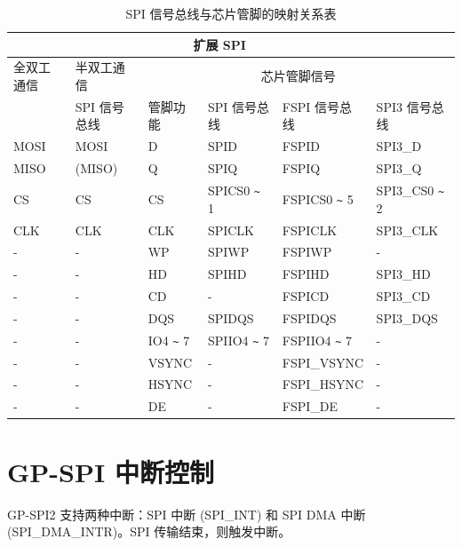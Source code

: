\documentclass[main\_\_CN.tex]{subfiles}
\begin{document}
\begin{longtable}[c]{|p{2.0cm}|p{2.0cm}|p{1.5cm}|p{2cm}|p{3.5cm}|p{2.5cm}|}    \caption{SPI 信号总线与芯片管脚的映射关系表}
\label{table:SPI_signals}\\
\hline
    \rowcolor{lightgray}
    \multicolumn{2}{c|}{标准 SPI} & \multicolumn{4}{c|}{扩展 SPI}\\
    \hline
    \rowcolor{lightgray}
    全双工通信 & 半双工通信 & \multicolumn{4}{c|}{芯片管脚信号}\\
    \hline
    \rowcolor{lightgray}
    \multirow{-1}{*}{SPI 信号总线} & \multirow{-1}{*}{SPI 信号总线} & \multirow{-1}{*}{管脚功能} & SPI 信号总线 & FSPI 信号总线 & SPI3 信号总线 \\
    \hline
    MOSI & MOSI   & D  & SPID             & FSPID  & SPI3\_D \\
    \hline
    MISO & (MISO) & Q  & SPIQ             & FSPIQ  & SPI3\_Q \\
    \hline
      CS & CS     & CS & SPICS0  \verb+~+ 1  & FSPICS0  \verb+~+ 5
                  & SPI3\_CS0 \verb+~+ 2  \\
    \hline
     CLK & CLK    & CLK& SPICLK           & FSPICLK& SPI3\_CLK \\
    \hline
       - & -      & WP & SPIWP            & FSPIWP & -        \\
    \hline
       - & -      & HD & SPIHD            & FSPIHD & SPI3\_HD \\
    \hline
       - & -      & CD & -               & FSPICD & SPI3\_CD \\
    \hline
       - & -      & DQS & SPIDQS         & FSPIDQS & SPI3\_DQS \\
    \hline
       - & -      & IO4 \verb+~+ 7 & SPIIO4 \verb+~+ 7   & FSPIIO4 \verb+~+ 7 & - \\
    \hline
       - & -      & VSYNC & -      & FSPI\_VSYNC & - \\
    \hline
       - & -      & HSYNC & -      & FSPI\_HSYNC & - \\
    \hline
       - & -      & DE    & -      & FSPI\_DE & - \\
    \hline
\end{longtable}

\section{GP-SPI 中断控制} \label{Section:SPI_Interrupt}

GP-SPI2 支持两种中断：SPI 中断 (SPI\_INT) 和 SPI DMA 中断 (SPI\_DMA\_INTR)。SPI 传输结束，则触发中断。
\end{document}
